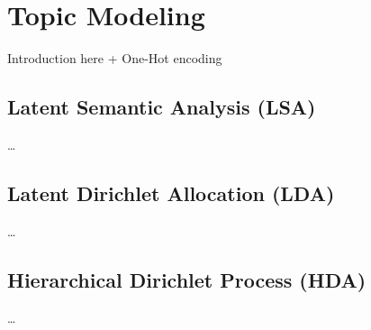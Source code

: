 \chapter{Topic Modeling}
Introduction here + One-Hot encoding

\section{Latent Semantic Analysis (LSA)}
\dots

\section{Latent Dirichlet Allocation (LDA)}
\dots

\section{Hierarchical Dirichlet Process (HDA)}
\dots